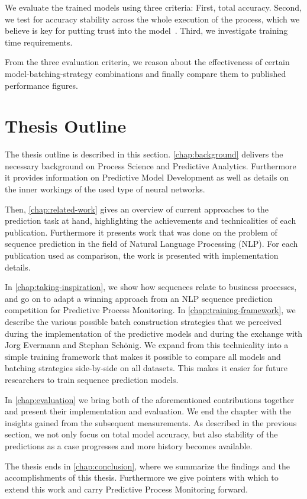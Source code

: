 We evaluate the trained models using three criteria: First, total accuracy. Second, we test for accuracy stability across the whole execution of the process, which we believe is key for putting trust into the model~\cite{francescomarino2015, boehmer2018probability}. Third, we investigate training time requirements.

From the three evaluation criteria, we reason about the effectiveness of certain model-batching-strategy combinations and finally compare them to published performance figures.

\section{Thesis Outline}\label{sec:intro:outline}
The thesis outline is described in this section. \autoref{chap:background} delivers the necessary background on Process Science and Predictive Analytics. Furthermore it provides information on Predictive Model Development as well as details on the inner workings of the used type of neural networks.

Then, \autoref{chap:related-work} gives an overview of current approaches to the prediction task at hand, highlighting the achievements and technicalities of each publication. Furthermore it presents work that was done on the problem of sequence prediction in the field of Natural Language Processing (NLP). For each publication used as comparison, the work is presented with implementation details.

In \autoref{chap:taking-inspiration}, we show how sequences relate to business processes, and go on to adapt a winning approach from an NLP sequence prediction competition for Predictive Process Monitoring. In \autoref{chap:training-framework}, we describe the various possible batch construction strategies that we perceived  during the implementation of the predictive models and during the exchange with Jorg Evermann and Stephan Schönig. We expand from this technicality into a simple training framework that makes it possible to compare all models and batching strategies side-by-side on all datasets. This makes it easier for future researchers to train sequence prediction models.

In \autoref{chap:evaluation} we bring both of the aforementioned contributions together and present their implementation and evaluation. We end the chapter with the insights gained from the subsequent measurements. As described in the previous section, we not only focus on total model accuracy, but also stability of the predictions as a case progresses and more history becomes available.

The thesis ends in \autoref{chap:conclusion}, where we summarize the findings and the accomplishments of this thesis. Furthermore we give pointers with which to extend this work and carry Predictive Process Monitoring forward.
